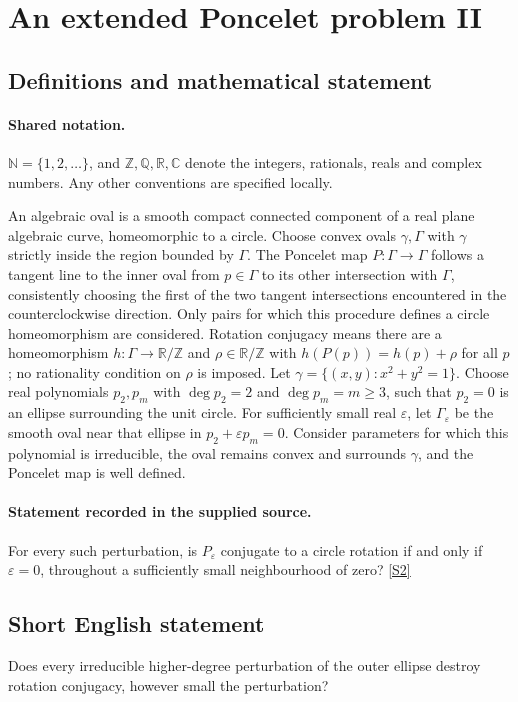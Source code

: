 \documentclass[11pt]{article}
\newcommand{\sref}[2]{\hyperlink{source:#1:#2}{[S#2]}}
\begin{document}
\section{An extended Poncelet problem II}\label{statement}

\subsection{Definitions and mathematical statement}

\paragraph{Shared notation.}$\mathbb N=\{1,2,\ldots\}$, and $\mathbb Z,\mathbb Q,\mathbb R,\mathbb C$ denote the integers, rationals, reals and complex numbers. Any other conventions are specified locally.


An algebraic oval is a smooth compact connected component of a real plane algebraic curve, homeomorphic to a circle. Choose convex ovals $\gamma,\Gamma$ with $\gamma$ strictly inside the region bounded by $\Gamma$. The Poncelet map $P:\Gamma\to\Gamma$ follows a tangent line to the inner oval from $p\in\Gamma$ to its other intersection with $\Gamma$, consistently choosing the first of the two tangent intersections encountered in the counterclockwise direction. Only pairs for which this procedure defines a circle homeomorphism are considered. Rotation conjugacy means there are a homeomorphism $h:\Gamma\to\mathbb R/\mathbb Z$ and $\rho\in\mathbb R/\mathbb Z$ with $h(P(p))=h(p)+\rho$ for all $p$; no rationality condition on $\rho$ is imposed. Let $\gamma=\{(x,y):x^2+y^2=1\}$. Choose real polynomials $p_2,p_m$ with $\deg p_2=2$ and $\deg p_m=m\ge3$, such that $p_2=0$ is an ellipse surrounding the unit circle. For sufficiently small real $\varepsilon$, let $\Gamma_\varepsilon$ be the smooth oval near that ellipse in $p_2+\varepsilon p_m=0$. Consider parameters for which this polynomial is irreducible, the oval remains convex and surrounds $\gamma$, and the Poncelet map is well defined.
\paragraph{Statement recorded in the supplied source.}
For every such perturbation, is $P_\varepsilon$ conjugate to a circle rotation if and only if $\varepsilon=0$, throughout a sufficiently small neighbourhood of zero? \sref{statement}{2}
\subsection{Short English statement}
Does every irreducible higher-degree perturbation of the outer ellipse destroy rotation conjugacy, however small the perturbation?
\end{document}
